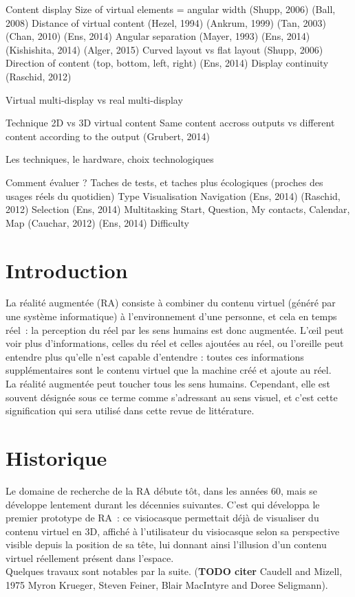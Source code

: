         Content display 
            Size of virtual elements = angular width (Shupp, 2006) (Ball, 2008) 
            Distance of virtual content (Hezel, 1994) (Ankrum, 1999) (Tan, 2003) (Chan, 2010) (Ens, 2014) 
            Angular separation (Mayer, 1993) (Ens, 2014) (Kishishita, 2014) (Alger, 2015) 
            Curved layout vs flat layout (Shupp, 2006) 
            Direction of content (top, bottom, left, right) (Ens, 2014) 
            Display continuity (Raschid, 2012) 

        Virtual multi-display vs real multi-display 

        Technique 
            2D vs 3D virtual content 
            Same content accross outputs vs different content according to the output (Grubert, 2014) 

Les techniques, le hardware, choix technologiques

Comment évaluer ? Taches de tests, et taches plus écologiques (proches des usages réels du quotidien)
    Type
        Visualisation 
        Navigation (Ens, 2014) (Raschid, 2012) 
        Selection (Ens, 2014) 
        Multitasking 
            Start, Question, My contacts, Calendar, Map (Cauchar, 2012) (Ens, 2014) 
    Difficulty



\section*{Introduction}

La réalité augmentée (RA) consiste à combiner du contenu virtuel (généré par une système informatique) à l'environnement d'une personne, et cela en temps réel~: la perception du réel par les sens humains est donc augmentée. L’œil peut voir plus d'informations, celles du réel et celles ajoutées au réel, ou l'oreille peut entendre plus qu'elle n'est capable d'entendre : toutes ces informations supplémentaires sont le contenu virtuel que la machine créé et ajoute au réel.\\
La réalité augmentée peut toucher tous les sens humains. Cependant, elle est souvent désignée sous ce terme comme s'adressant au sens visuel, et c'est cette signification qui sera utilisé dans cette revue de littérature.

\section*{Historique}
Le domaine de recherche de la RA débute tôt, dans les années 60, mais se développe lentement durant les décennies suivantes. C'est \citet{Sutherland1968} qui développa le premier prototype de RA~: ce visiocasque permettait déjà de visualiser du contenu virtuel en 3D, affiché à l'utilisateur du visiocasque selon sa perspective visible depuis la position de sa tête, lui donnant ainsi l'illusion d'un contenu virtuel réellement présent dans l'espace.\\
Quelques travaux sont notables par la suite. (\textbf{TODO citer} Caudell and Mizell, 1975 Myron Krueger, Steven Feiner, Blair MacIntyre and Doree Seligmann).

